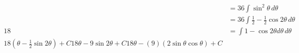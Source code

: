 \documentclass[preview]{standalone}
\begin{document}
\begin{align*}
&=36 \int \sin^2\theta \, d\theta \\ &=36 \int \frac{1}{2} - \frac{1}{2}\cos2\theta \, d\theta \\ 18&= \int 1-\cos2\theta d\theta \, d\theta \\ 18(\theta-\frac{1}{2}\sin2\theta) + C 18\theta-9\sin2\theta +C 18\theta-(9)(2\sin\theta\cos\theta) + C
\end{align*}
\end{document}
